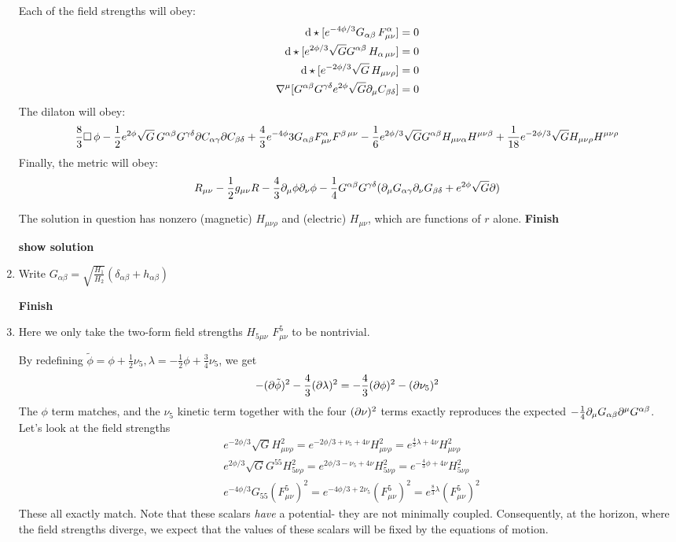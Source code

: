 \documentclass[11pt, class=article, crop=false]{standalone}
\begin{document}
\begin{enumerate}
	Each of the field strengths will obey:
	\[
		\begin{aligned}
			\mathrm{d}\star [e^{-4 \phi/3} G_{\alpha \beta} \, F^{\alpha}_{\mu \nu} ]&= 0\\
			\mathrm{d}\star [e^{2 \phi/3} \sqrt{G} G^{\alpha \beta}\,  H_{\alpha\, \mu \nu} ]&= 0\\
			\mathrm{d}\star [e^{-2 \phi/3} \sqrt{G}\,  H_{\mu \nu \rho} ]&= 0\\
			\nabla^{\mu} [G^{\alpha \beta} G^{\gamma \delta} e^{2 \phi} \sqrt{G} \partial_\mu C_{\beta \delta}] &= 0
		\end{aligned}
	\]
	The dilaton will obey:
	\[
		\frac83 \Box \, \phi - \frac12 e^{2\phi} \sqrt G \, G^{\alpha \beta} G^{\gamma \delta} \partial C_{\alpha \gamma} \partial C_{\beta \delta} + \frac{4}{3}  e^{-4 \phi}{3} G_{\alpha \beta} F^{\alpha}_{\mu \nu} F^{\beta\, \mu \nu} - \frac{1}{6} e^{2\phi/3} \sqrt{G} G^{\alpha \beta} H_{\mu \nu \alpha} H^{\mu \nu \beta} + \frac{1}{18} e^{-2\phi/3} \sqrt{G} H_{\mu \nu \rho} H^{\mu \nu \rho}
	\]
	Finally, the metric will obey:
	\[
		R_{\mu \nu} - \frac12 g_{\mu \nu} R - \frac43 \partial_\mu \phi \partial_\nu \phi - \frac14  G^{\alpha \beta} G^{\gamma \delta}( \partial_\mu G_{\alpha \gamma} \partial_\nu G_{\beta \delta} + e^{2 \phi} \sqrt{G} \partial)
	\]
	
	The solution in question has nonzero (magnetic) $H_{\mu \nu \rho}$ and (electric) $H_{\mu \nu}$, which are functions of $r$ alone.
	\textbf{Finish}
	
	\textbf{show solution}
	
	\item Write $G_{\alpha \beta} = \sqrt{\frac{H_1}{H_2}} (\delta_{\alpha \beta} + h_{\alpha \beta})$
	
	\textbf{Finish}
	
	\item 
	Here we only take the two-form field strengths $H_{5 \mu \nu}$ $F^5_{\mu \nu}$ to be nontrivial. 
	
	By redefining $\tilde \phi = \phi+\frac12 \nu_5, \lambda = -\frac12 \phi + \frac34 \nu_5$, we get
	\[
		- (\partial \tilde \phi)^2 - \frac43 (\partial \lambda)^2 = - \frac43 (\partial \phi)^2 - (\partial \nu_5)^2
	\]
	The $\phi$ term matches, and the $\nu_5$ kinetic term together with the four $(\partial \nu)^2$ terms exactly reproduces the expected $-\frac14 \partial_\mu G_{\alpha \beta} \partial^\mu G^{\alpha \beta }$. Let's look at the field strengths
	\[
	\begin{aligned}
		&e^{-2\phi/3} \sqrt G H_{\mu \nu \rho}^2 = e^{-2\phi/3 + \nu_5 + 4 \nu} H_{\mu \nu \rho}^2 = e^{\frac43 \lambda + 4 \nu}  H_{\mu \nu \rho}^2\\
		& e^{2\phi/3} \sqrt G  G^{55} H_{5 \nu \rho}^2 = e^{2\phi/3 - \nu_5 + 4 \nu} H_{5 \nu \rho}^2 = e^{-\frac43 \phi + 4 \nu} H_{5 \nu \rho}^2\\
		& e^{-4 \phi/3} G_{55} (F^5_{\mu \nu})^2 = e^{-4\phi/3 + 2 \nu_5}  (F^5_{\mu \nu})^2 = e^{\frac83 \lambda} (F^5_{\mu \nu})^2
	\end{aligned}
	\]
	These all exactly match. Note that these scalars \emph{have} a potential- they are not minimally coupled. Consequently, at the horizon, where the field strengths diverge, we expect that the values of these scalars will be fixed by the equations of motion. 
	

\end{enumerate}
\end{document}
